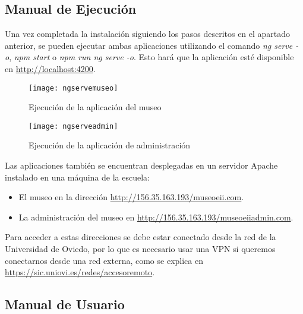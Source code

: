 \subsection{Manual de Ejecución} 
Una vez completada la instalación siguiendo los pasos descritos en el apartado anterior, se pueden ejecutar ambas aplicaciones utilizando el comando \textit{ng serve -o}, \textit{npm start} o \textit{npm run ng serve -o}. Esto hará que la aplicación esté disponible en \url{http://localhost:4200}.
\begin{figure}[H]
\centering
\texttt{[image: ngservemuseo]}
\caption{Ejecución de la aplicación del museo}
\end{figure}
\begin{figure}[H]
\centering
\texttt{[image: ngserveadmin]}
\caption{Ejecución de la aplicación de administración}
\end{figure}
\par Las aplicaciones también se encuentran desplegadas en un servidor Apache instalado en una máquina de la escuela:
\begin{itemize}
\item El museo en la dirección \url{http://156.35.163.193/museoeii.com}. 
\item La administración del museo en \url{http://156.35.163.193/museoeiiadmin.com}.
\end{itemize}
Para acceder a estas direcciones se debe estar conectado desde la  red de la Universidad de Oviedo, por lo que es necesario usar una VPN si queremos conectarnos desde una red externa, como se explica en \url{https://sic.uniovi.es/redes/accesoremoto}.


\subsection{Manual de Usuario} 
